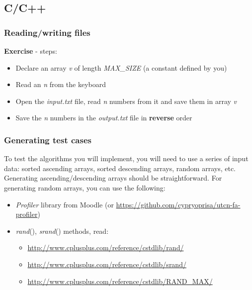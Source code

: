 \documentclass[../en-fa-lab.tex]{subfiles}
\begin{document}
\subsection{C/C++}\label{cc}

\subsubsection{Reading/writing files}\label{readingwriting-files}

\textbf{Exercise} - steps:

\begin{itemize}
\item
  Declare an array \emph{v} of length \emph{MAX\_SIZE} (a constant
  defined by you)
\item
  Read an \emph{n} from the keyboard
\item
  Open the \emph{input.txt} file, read \emph{n} numbers from it and save
  them in array \emph{v}
\item
  Save the \emph{n} numbers in the \emph{output.txt} file in
  \textbf{reverse} order
\end{itemize}

\subsubsection{Generating test cases}\label{generare-cazuri-de-testare}

To test the algorithms you will implement, you will need to use a series
of input data: sorted ascending arrays, sorted descending arrays, random
arrays, etc. Generating ascending/descending arrays should be
straightforward. For generating random arrays, you can use the
following:

\begin{itemize}
\item
  \emph{Profiler} library from Moodle (or
  \url{https://github.com/cypryoprisa/utcn-fa-profiler})
\item
  \emph{rand}(), \emph{srand}() methods, read:

  \begin{itemize}
  \item
    \url{http://www.cplusplus.com/reference/cstdlib/rand/}
  \item
    \url{http://www.cplusplus.com/reference/cstdlib/srand/}
  \item
    \url{http://www.cplusplus.com/reference/cstdlib/RAND_MAX/}
  \end{itemize}
\end{itemize}
\end{document}
